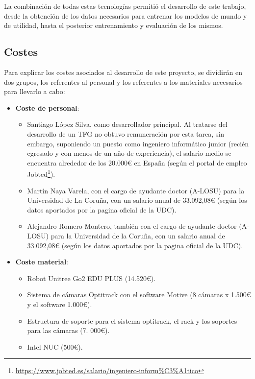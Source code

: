 La combinación de todas estas tecnologías permitió el desarrollo de este trabajo, desde la obtención de los datos necesarios para entrenar 
los modelos de mundo y de utilidad, hasta el posterior entrenamiento y evaluación de los mismos.

\subsection{Costes}
\label{sec:costes}

Para explicar los costes asociados al desarrollo de este proyecto, se dividirán en dos grupos, los referentes al personal y los referentes 
a los materiales necesarios para llevarlo a cabo:

\begin{itemize}
    \item \textbf{Coste de personal}:
    
    \begin{itemize}
        \item Santiago López Silva, como desarrollador principal. Al tratarse del desarrollo de un TFG no obtuvo remuneración por esta tarea, 
        sin embargo, suponiendo un puesto como ingeniero informático junior (recién egresado y con menos de un año de experiencia), el salario 
        medio se encuentra alrededor de los 20.000€ en España (según el portal de empleo 
        Jobted\footnote{\url{https://www.jobted.es/salario/ingeniero-inform\%C3\%A1tico}}).
        \item Martín Naya Varela, con el cargo de ayudante doctor (A-LOSU) para la Universidad de La Coruña, con un salario anual de 
        33.092,08€ (según los datos aportados por la pagina oficial de la UDC\footnotemark).
        \item Alejandro Romero Montero, también con el cargo de ayudante doctor (A-LOSU) para la Universidad de la Coruña, con un salario anual 
        de 33.092,08€ (según los datos aportados por la pagina oficial de la UDC\footnotemark[\value{footnote}]).
    \end{itemize}
    
    \item \textbf{Coste material}:
    
    \begin{itemize}
        \item Robot Unitree Go2 EDU PLUS (14.520€).
        \item Sistema de cámaras Optitrack con el software Motive (8 cámaras x 1.500€ y el software 1.000€).
        \item Estructura de soporte para el sistema optitrack, el rack y los soportes para las cámaras (7.  000€).
        \item Intel NUC (500€).
    \end{itemize}

\end{itemize}

